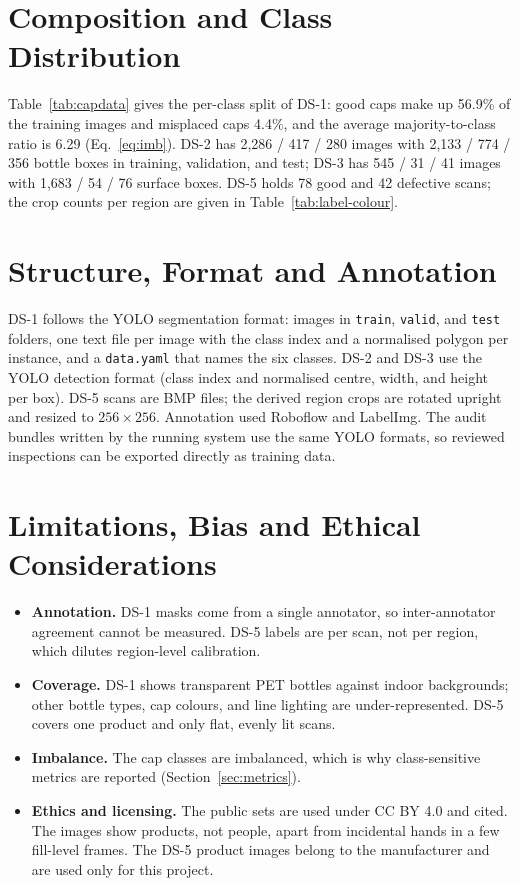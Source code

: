 \section{Composition and Class Distribution}
Table~\ref{tab:capdata} gives the per-class split of DS-1: good caps make up 56.9\% of the training images and misplaced caps 4.4\%, and the average majority-to-class ratio is 6.29 (Eq.~\eqref{eq:imb}). DS-2 has 2,286 / 417 / 280 images with 2,133 / 774 / 356 bottle boxes in training, validation, and test; DS-3 has 545 / 31 / 41 images with 1,683 / 54 / 76 surface boxes. DS-5 holds 78 good and 42 defective scans; the crop counts per region are given in Table~\ref{tab:label-colour}.

\section{Structure, Format and Annotation}
DS-1 follows the YOLO segmentation format: images in \texttt{train}, \texttt{valid}, and \texttt{test} folders, one text file per image with the class index and a normalised polygon per instance, and a \texttt{data.yaml} that names the six classes. DS-2 and DS-3 use the YOLO detection format (class index and normalised centre, width, and height per box). DS-5 scans are BMP files; the derived region crops are rotated upright and resized to $256{\times}256$. Annotation used Roboflow and LabelImg. The audit bundles written by the running system use the same YOLO formats, so reviewed inspections can be exported directly as training data.

\section{Limitations, Bias and Ethical Considerations}
\begin{itemize}
    \item \textbf{Annotation.} DS-1 masks come from a single annotator, so inter-annotator agreement cannot be measured. DS-5 labels are per scan, not per region, which dilutes region-level calibration.
    \item \textbf{Coverage.} DS-1 shows transparent PET bottles against indoor backgrounds; other bottle types, cap colours, and line lighting are under-represented. DS-5 covers one product and only flat, evenly lit scans.
    \item \textbf{Imbalance.} The cap classes are imbalanced, which is why class-sensitive metrics are reported (Section~\ref{sec:metrics}).
    \item \textbf{Ethics and licensing.} The public sets are used under CC BY 4.0 and cited. The images show products, not people, apart from incidental hands in a few fill-level frames. The DS-5 product images belong to the manufacturer and are used only for this project.
\end{itemize}

